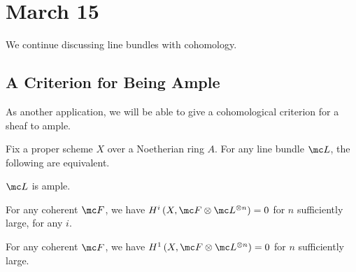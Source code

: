 \documentclass[../notes.tex]{subfiles}
\begin{document}
\section{March 15}

We continue discussing line bundles with cohomology.

\subsection{A Criterion for Being Ample}
As another application, we will be able to give a cohomological criterion for a sheaf to ample.
\begin{theorem} \label{thm:higher-twist-dies}
	Fix a proper scheme $X$ over a Noetherian ring $A$. For any line bundle $\mc L$, the following are equivalent.
	\begin{listalph}
		\item $\mc L$ is ample.
		\item For any coherent $\mc F$, we have $H^i\left(X,\mc F\otimes\mc L^{\otimes n}\right)=0$ for $n$ sufficiently large, for any $i$.
		\item For any coherent $\mc F$, we have $H^1\left(X,\mc F\otimes\mc L^{\otimes n}\right)=0$ for $n$ sufficiently large.
	\end{listalph}
\end{theorem}
\end{document}
